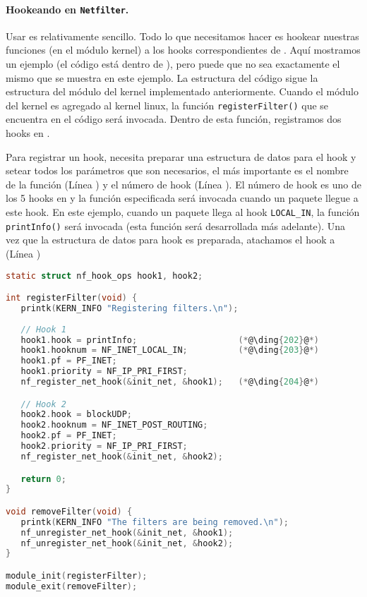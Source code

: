\paragraph{Hookeando en \texttt{Netfilter}.} 

Usar \netfilter es relativamente sencillo. Todo lo que necesitamos hacer es hookear nuestras funciones (en el módulo kernel) a los hooks correspondientes de \netfilter. Aquí mostramos un ejemplo (el código está dentro de ), pero puede que no sea exactamente el mismo que se muestra en este ejemplo.
La estructura del código sigue la estructura del módulo del kernel implementado anteriormente. Cuando el módulo del kernel es agregado al kernel linux, la función \texttt{registerFilter()} que se encuentra en el código será invocada. Dentro de esta función, registramos dos hooks en \netfilter.

Para registrar un hook, necesita preparar una estructura de datos para el hook y setear todos los parámetros que son necesarios, el más importante es el nombre de la función (Línea ) y el número de hook (Línea ).
El número de hook es uno de los 5 hooks en \netfilter y la función especificada será invocada cuando un paquete llegue a este hook. En este ejemplo, cuando un paquete llega al hook \texttt{LOCAL\_IN}, la función \texttt{printInfo()} será invocada (esta función será desarrollada más adelante). Una vez que la estructura de datos para hook es preparada, atachamos el hook a \netfilter (Línea )


\begin{lstlisting}[language=C, caption={Register hook functions to \netfilter}]
static struct nf_hook_ops hook1, hook2;

int registerFilter(void) {
   printk(KERN_INFO "Registering filters.\n");
   
   // Hook 1
   hook1.hook = printInfo;                    (*@\ding{202}@*)
   hook1.hooknum = NF_INET_LOCAL_IN;          (*@\ding{203}@*)
   hook1.pf = PF_INET;
   hook1.priority = NF_IP_PRI_FIRST;
   nf_register_net_hook(&init_net, &hook1);   (*@\ding{204}@*)

   // Hook 2
   hook2.hook = blockUDP;
   hook2.hooknum = NF_INET_POST_ROUTING;
   hook2.pf = PF_INET;
   hook2.priority = NF_IP_PRI_FIRST;
   nf_register_net_hook(&init_net, &hook2);

   return 0;
}

void removeFilter(void) {
   printk(KERN_INFO "The filters are being removed.\n");
   nf_unregister_net_hook(&init_net, &hook1);
   nf_unregister_net_hook(&init_net, &hook2);
}

module_init(registerFilter);
module_exit(removeFilter);
\end{lstlisting}

